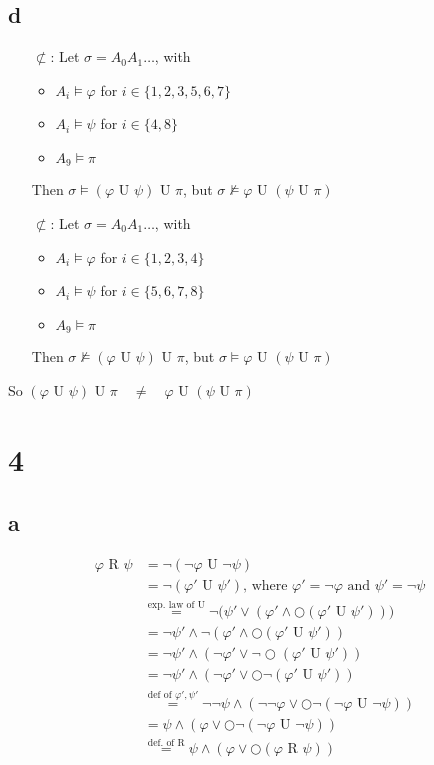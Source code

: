 \documentclass[11pt]{article}
\begin{document}
\subsection{d}
\begin{itemize}
	\item[$\not\subset$:] Let $\sigma = A_0A_1\dots$, with
	\begin{itemize}
		\item $A_i \models \varphi$ for $i\in\{1,2,3,5,6,7\}$
		\item $A_i \models \psi$ for $i \in \{4,8\}$
		\item $A_9 \models \pi$		
	\end{itemize}
	Then $\sigma \models (\varphi \text{ U } \psi) \text{ U } \pi$, but $\sigma \not\models \varphi \text{ U } ( \psi \text{ U } \pi)$
	\item [$\not\subset$:] Let $\sigma = A_0A_1\dots$, with
	\begin{itemize}
		\item $A_i \models \varphi$ for $i\in\{1,2,3,4\}$
		\item $A_i \models \psi$ for $i \in \{5,6,7,8\}$
		\item $A_9 \models \pi$		
	\end{itemize}
	Then $\sigma \not\models (\varphi \text{ U } \psi) \text{ U } \pi$, but $\sigma \models \varphi \text{ U } ( \psi \text{ U } \pi)$
\end{itemize}
	So $(\varphi \text{ U } \psi) \text{ U } \pi \quad \neq \quad  \varphi \text{ U } (\psi \text{ U } \pi)$

\section{4}
\subsection{a}
\begin{align*}
\varphi \text{ R } \psi &= \lnot(\lnot\varphi \text{ U } \lnot\psi)\\
		&= \lnot(\varphi' \text{ U } \psi')\text{, where } \varphi' = \lnot\varphi \text{ and } \psi' = \lnot\psi \\
		&\stackrel{\text{exp. law of U}}{=} \lnot\big( \psi' \lor (\varphi' \land \bigcirc (\varphi' \text{ U } \psi')) \big) \\
		&= \lnot\psi' \land \lnot (\varphi' \land \bigcirc (\varphi' \text{ U } \psi')) \\
		&= \lnot\psi' \land  (\lnot\varphi' \lor \lnot\bigcirc (\varphi' \text{ U } \psi')) \\
		&= \lnot\psi' \land  (\lnot\varphi' \lor \bigcirc \lnot(\varphi' \text{ U } \psi')) \\
		&\stackrel{\text{def of }\varphi', \psi'}{=} \lnot\lnot\psi \land ( \lnot\lnot\varphi \lor \bigcirc \lnot(\lnot\varphi \text{ U }\lnot\psi))\\
		&= \psi \land ( \varphi \lor \bigcirc \lnot(\lnot\varphi \text{ U }\lnot\psi))\\
		&\stackrel{\text{def. of R}}{=} \psi \land ( \varphi \lor \bigcirc (\varphi \text{ R }\psi ))\\
\end{align*}
\end{document}
